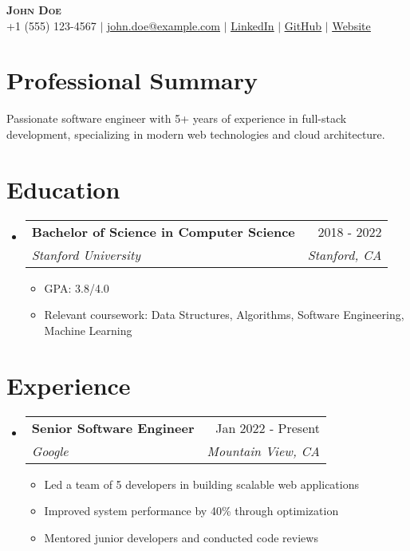 \documentclass[letterpaper,11pt]{article}
\makeatletter
\newcommand{\resumeItem}[1]{
  \item\small{
    {#1 \vspace{-2pt}}
  }
}
\newcommand{\resumeSubheading}[4]{
  \vspace{-2pt}\item
    \begin{tabular*}{0.97\textwidth}[t]{l@{\extracolsep{\fill}}r}
      \textbf{#1} & #2 \\
      \textit{\small#3} & \textit{\small #4} \\
    \end{tabular*}\vspace{-7pt}
}
\newcommand{\resumeSubHeadingListStart}{\begin{itemize}[leftmargin=0.15in, label={}]}
\newcommand{\resumeSubHeadingListEnd}{\end{itemize}}
\newcommand{\resumeItemListStart}{\begin{itemize}}
\newcommand{\resumeItemListEnd}{\end{itemize}\vspace{-5pt}}
\makeatother
\begin{document}
\begin{center}
    \textbf{\Huge \scshape John Doe} \\ \vspace{1pt}
    \small +1 (555) 123-4567 $|$ \href{mailto:john.doe@example.com}{\underline{john.doe@example.com}} $|$ \href{https://linkedin.com/in/johndoe}{\underline{LinkedIn}} $|$ \href{https://github.com/johndoe}{\underline{GitHub}} $|$ \href{https://johndoe.com}{\underline{Website}}
\end{center}

\section{Professional Summary}
 \begin{itemize}[leftmargin=0.15in, label={}]
    \small{\item{
     Passionate software engineer with 5+ years of experience in full-stack development, specializing in modern web technologies and cloud architecture.
    }}
 \end{itemize}

\section{Education}
  \resumeSubHeadingListStart
    \resumeSubheading
      {Bachelor of Science in Computer Science}{2018 - 2022}
      {Stanford University}{Stanford, CA}
      \resumeItemListStart
        \resumeItem{GPA: 3.8/4.0}
        \resumeItem{Relevant coursework: Data Structures, Algorithms, Software Engineering, Machine Learning}
      \resumeItemListEnd
  \resumeSubHeadingListEnd

\section{Experience}
  \resumeSubHeadingListStart
    \resumeSubheading
      {Senior Software Engineer}{Jan 2022 - Present}
      {Google}{Mountain View, CA}
      \resumeItemListStart
        \resumeItem{\textbullet Led a team of 5 developers in building scalable web applications}
        \resumeItem{\textbullet Improved system performance by 40\% through optimization}
        \resumeItem{\textbullet Mentored junior developers and conducted code reviews}
      \resumeItemListEnd
  \resumeSubHeadingListEnd
\end{document}
